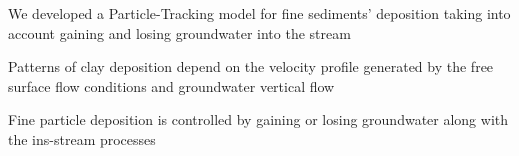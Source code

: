 \documentclass[draft,linenumbers]{agujournal2018}
\begin{document}








\begin{keypoints}
\item We developed a Particle-Tracking model for fine sediments' deposition taking into account gaining and losing groundwater into the stream
\item Patterns of clay deposition depend on the velocity profile generated by the free surface flow conditions and groundwater vertical flow
\item Fine particle deposition is controlled by gaining or losing groundwater along with the ins-stream processes
\end{keypoints}

\end{document}

